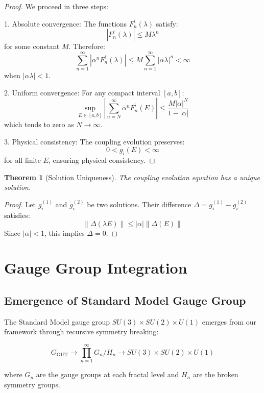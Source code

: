 \documentclass[12pt]{article}
\newtheorem{theorem}{Theorem}[section]
\begin{document}
\begin{proof}
We proceed in three steps:

1. Absolute convergence:
   The functions $F_n^i(\lambda)$ satisfy:
   \[
   |F_n^i(\lambda)| \leq M\lambda^n
   \]
   for some constant $M$. Therefore:
   \[
   \sum_{n=1}^{\infty} |\alpha^n F_n^i(\lambda)| \leq M\sum_{n=1}^{\infty} |\alpha\lambda|^n < \infty
   \]
   when $|\alpha\lambda| < 1$.

2. Uniform convergence:
   For any compact interval $[a,b]$:
   \[
   \sup_{E \in [a,b]} \left|\sum_{n=N}^{\infty} \alpha^n F_n^i(E)\right| \leq \frac{M|\alpha|^N}{1-|\alpha|}
   \]
   which tends to zero as $N \to \infty$.

3. Physical consistency:
   The coupling evolution preserves:
   \[
   0 < g_i(E) < \infty
   \]
   for all finite $E$, ensuring physical consistency.
\end{proof}

\begin{theorem}[Solution Uniqueness]
The coupling evolution equation has a unique solution.
\end{theorem}

\begin{proof}
Let $g_i^{(1)}$ and $g_i^{(2)}$ be two solutions. Their difference $\Delta = g_i^{(1)} - g_i^{(2)}$ satisfies:
\[
\|\Delta(\lambda E)\| \leq |\alpha|\|\Delta(E)\|
\]
Since $|\alpha| < 1$, this implies $\Delta = 0$.
\end{proof}

\section{Gauge Group Integration}
\label{app:gauge}

\subsection{Emergence of Standard Model Gauge Group}

The Standard Model gauge group $SU(3) \times SU(2) \times U(1)$ emerges from our framework through recursive symmetry breaking:

\begin{equation}
G_{\text{GUT}} \to \prod_{n=1}^{\infty} G_n/H_n \to SU(3) \times SU(2) \times U(1)
\end{equation}

where $G_n$ are the gauge groups at each fractal level and $H_n$ are the broken symmetry groups.
\end{document}
